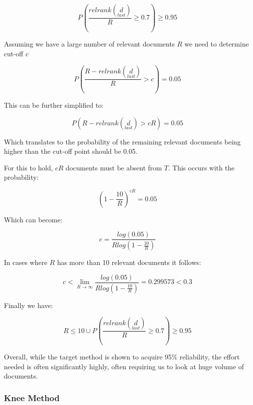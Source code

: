\begin{equation}
	  P(\frac{relrank(\underset{last}{d})}{R} \geqslant 0.7) \geqslant 0.95
\end{equation}


Assuming we have a large number of relevant documents $R$ we need to determine cut-off $c$

\begin{equation}
	  P( \frac{R - relrank(\underset{last}{d})}{R} > c) = 0.05
\end{equation}

This can be further simplified to:

\begin{equation}
	  P(R - relrank(\underset{last}{d}) > cR) = 0.05
\end{equation}

Which translates to the probability of the remaining relevant documents being higher than the cut-off point should be 0.05.

For this to hold, $cR$ documents must be absent from $T$. This occurs with the probability:


\begin{equation}
	  \left(1 - \frac{10}{R}\right)^{cR} = 0.05
\end{equation}

Which can become:

\begin{equation}
	  c = \frac{log(0.05)}{R log(1 - \frac{10}{R})}
\end{equation}


In cases where $R$ has more than 10 relevant documents it follows:


\begin{equation}
	  c < \lim_{R \to \infty} \frac{log(0.05)}{R log (1 - \frac{10}{R})} = 0.299573 < 0.3
\end{equation}

Finally we have:

\begin{equation}
	 R \leq 10 \cup P(\frac{relrank(\underset{last}{d})}{R} \geq 0.7) 	\geq 0.95
\end{equation}

Overall, while the target method is shown to acquire 95\% reliability, the effort needed is often significantly highly, often requiring us to look at huge volume of documents.

\subsubsection{Knee Method} \label{knee}

